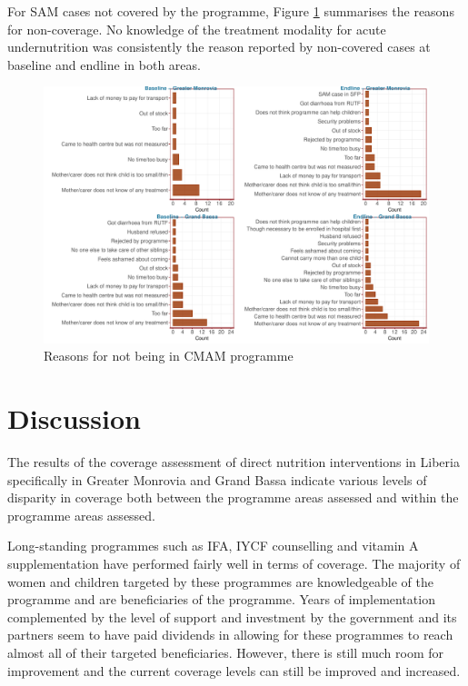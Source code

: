 \documentclass[12pt,a4paper]{article}
\begin{document}
For SAM cases not covered by the programme, Figure \ref{fig:cmam2plot} summarises the reasons for non-coverage. No knowledge of the treatment modality for acute undernutrition was consistently the reason reported by non-covered cases at baseline and endline in both areas.

\begin{figure}[H]

{\centering \includegraphics{liberiaCoverageFinalReport_files/figure-latex/cmam2plot-1} 

}

\caption{Reasons for not being in CMAM programme}\label{fig:cmam2plot}
\end{figure}

\hypertarget{discussion}{%
\section{Discussion}\label{discussion}}

The results of the coverage assessment of direct nutrition interventions in Liberia specifically in Greater Monrovia and Grand Bassa indicate various levels of disparity in coverage both between the programme areas assessed and within the programme areas assessed.

Long-standing programmes such as IFA, IYCF counselling and vitamin A supplementation have performed fairly well in terms of coverage. The majority of women and children targeted by these programmes are knowledgeable of the programme and are beneficiaries of the programme. Years of implementation complemented by the level of support and investment by the government and its partners seem to have paid dividends in allowing for these programmes to reach almost all of their targeted beneficiaries. However, there is still much room for improvement and the current coverage levels can still be improved and increased.
\end{document}
